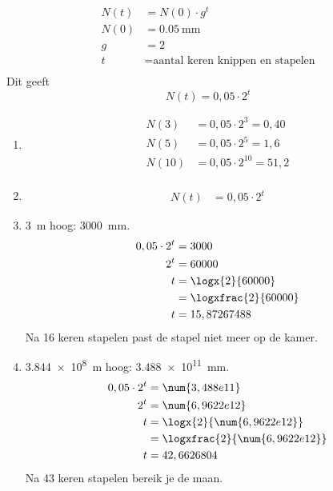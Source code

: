\begin{antwoord}{19}
\begin{align*}
N(t) &= N(0) \cdot g^t \\ 
N(0) &= \SI{0,05}{\mm}\\
g &= 2\\
t &= \text{aantal keren knippen en stapelen}\\
\end{align*}
Dit geeft 
\[N(t) = 0,05 \cdot 2^t
\]
\begin{enumerate}
  \item 
  \begin{align*}
   N(3) &= 0,05 \cdot 2^3 = 0,40 \\
      N(5) &= 0,05 \cdot 2^5 = 1,6 \\
         N(10) &= 0,05 \cdot 2^{10} = 51,2 \\
  \end{align*}
  \item 
  \begin{align*}
N(t) &= 0,05 \cdot 2^t
  \end{align*}
\item \SI{3}{\m} hoog: \SI{3000}{\mm}.
\begin{align*}
0,05 \cdot 2^t  &= 3000\\
2^t  &= 60000\\
t  &= \logx{2}{60000}\\
&= \logxfrac{2}{60000}\\
t&= 15,87267488
\end{align*}
Na 16 keren stapelen past de stapel niet meer op de kamer.
\item \SI{3,844e8}{\m} hoog: \SI{3,488e11}{\mm}.
\begin{align*}
0,05 \cdot 2^t  &= \num{3,488e11}\\
2^t  &= \num{6,9622e12}\\
t  &= \logx{2}{\num{6,9622e12}}\\
&= \logxfrac{2}{\num{6,9622e12}}\\
t&= 42,6626804
\end{align*}
Na 43 keren stapelen bereik je de maan.


 \end{enumerate}
\end{antwoord}

